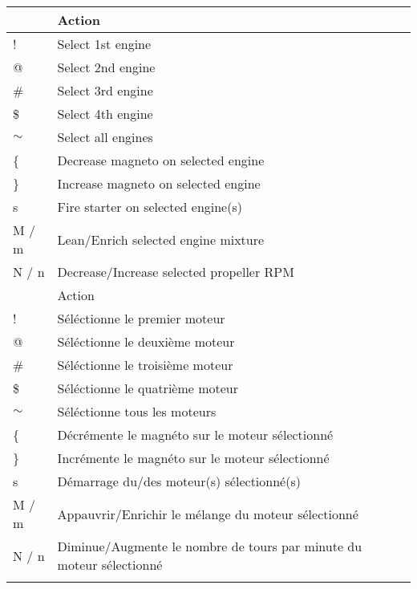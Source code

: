 \begin{tabular}{|l|l|}\hline
\iflanguage{english}{
Key      &  Action\\ \hline
   !     & Select 1st engine\\
   @	   & Select 2nd engine\\
  \#     & Select 3rd engine\\
  \$     & Select 4th engine\\
  $\sim$ & Select all engines\\\hline
  \{     & Decrease magneto on selected engine\\
  \}     & Increase magneto on selected engine\\
   s     & Fire starter on selected engine(s)\\
  M / m  & Lean/Enrich selected engine mixture\\
  N / n  & Decrease/Increase selected propeller RPM\\\hline
}{}
\iflanguage{french}{
Touche     &  Action\\ \hline
   !     & S\'{e}l\'{e}ctionne le premier moteur\\
   @	 & S\'{e}l\'{e}ctionne le deuxi\`{e}me moteur\\
  \#     & S\'{e}l\'{e}ctionne le troisi\`{e}me moteur\\
  \$     & S\'{e}l\'{e}ctionne le quatri\`{e}me moteur\\
  $\sim$ & S\'{e}l\'{e}ctionne tous les moteurs\\\hline
  \{     & D\'{e}cr\'{e}mente le magn\'{e}to sur le moteur s\'{e}lectionn\'{e}\\
  \}     & Incr\'{e}mente le magn\'{e}to sur le moteur s\'{e}lectionn\'{e}\\
   s     & D\'{e}marrage du/des moteur(s) s\'{e}lectionn\'{e}(s)\\
  M / m  & Appauvrir/Enrichir le m\'{e}lange du moteur s\'{e}lectionn\'{e}\\
  N / n  & Diminue/Augmente le nombre de tours par minute du moteur s\'{e}lectionn\'{e}\\\hline
}{}
\end{tabular}

